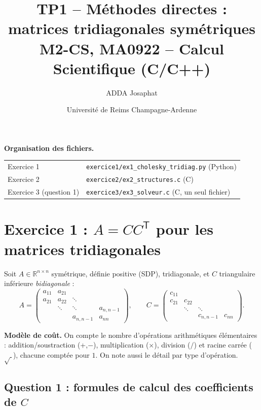 \documentclass[11pt,a4paper]{article}
\title{\textbf{TP1 -- Méthodes directes : matrices tridiagonales symétriques}\\[2pt]
\large M2-CS, MA0922 -- Calcul Scientifique (C/C++)}
\author{ADDA Josaphat}
\date{Université de Reims Champagne-Ardenne}
\newcommand{\R}{\mathbb{R}}
\newcommand{\T}{\mathsf{T}}
\begin{document}
\maketitle

\noindent\textbf{Organisation des fichiers.}
\begin{center}
\begin{tabular}{ll}
\toprule
Exercice 1 & \texttt{exercice1/ex1\_cholesky\_tridiag.py} (Python)\\
Exercice 2 & \texttt{exercice2/ex2\_structures.c} (C)\\
Exercice 3 (question 1) & \texttt{exercice3/ex3\_solveur.c} (C, un seul fichier)\\
\bottomrule
\end{tabular}
\end{center}

\section{Exercice 1 : $A=CC^\T$ pour les matrices tridiagonales}

Soit $A\in\R^{n\times n}$ symétrique, définie positive (SDP), tridiagonale, et
$C$ triangulaire inférieure \emph{bidiagonale} :
\[
A=\begin{pmatrix}
a_{11}&a_{21}&&\\
a_{21}&a_{22}&\ddots&\\
&\ddots&\ddots&a_{n,n-1}\\
&&a_{n,n-1}&a_{nn}
\end{pmatrix},\qquad
C=\begin{pmatrix}
c_{11}&&&\\
c_{21}&c_{22}&&\\
&\ddots&\ddots&\\
&&c_{n,n-1}&c_{nn}
\end{pmatrix}.
\]

\textbf{Modèle de coût.} On compte le nombre d'opérations arithmétiques
élémentaires : addition/soustraction (+,$-$), multiplication ($\times$),
division ($/$) et racine carrée ($\sqrt{\ }$), chacune comptée pour $1$.
On note aussi le détail par type d'opération.

\subsection{Question 1 : formules de calcul des coefficients de $C$}
\end{document}
